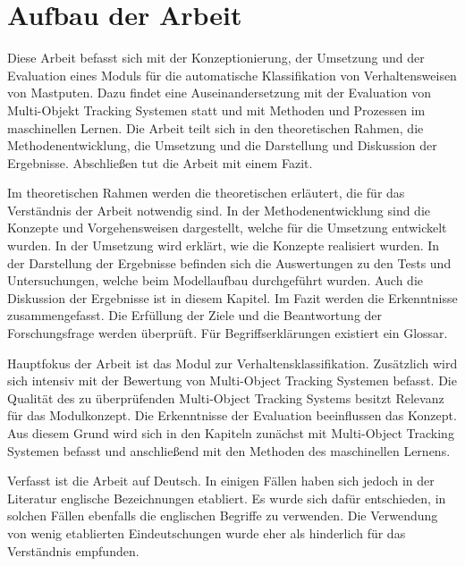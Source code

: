 \section{Aufbau der Arbeit}
Diese Arbeit befasst sich mit der Konzeptionierung, der Umsetzung und der Evaluation eines Moduls für die automatische Klassifikation von Verhaltensweisen von Mastputen. Dazu findet eine Auseinandersetzung mit der Evaluation von Multi-Objekt Tracking Systemen statt und mit Methoden und Prozessen im maschinellen Lernen. Die Arbeit teilt sich in den theoretischen Rahmen, die Methodenentwicklung, die Umsetzung und die Darstellung und Diskussion der Ergebnisse. Abschließen tut die Arbeit mit einem Fazit. \par

Im theoretischen Rahmen werden die theoretischen erläutert, die für das Verständnis der Arbeit notwendig sind. In der Methodenentwicklung sind die Konzepte und Vorgehensweisen dargestellt, welche für die Umsetzung entwickelt wurden. In der Umsetzung wird erklärt, wie die Konzepte realisiert wurden. In der Darstellung der Ergebnisse befinden sich die Auswertungen zu den Tests und Untersuchungen, welche beim Modellaufbau durchgeführt wurden. Auch die Diskussion der Ergebnisse ist in diesem Kapitel. Im Fazit werden die Erkenntnisse zusammengefasst. Die Erfüllung der Ziele und die Beantwortung der Forschungsfrage werden überprüft. Für Begriffserklärungen existiert ein Glossar.\par

Hauptfokus der Arbeit ist das Modul zur Verhaltensklassifikation. Zusätzlich wird sich intensiv mit der Bewertung von Multi-Object Tracking Systemen befasst. Die Qualität des zu überprüfenden Multi-Object Tracking Systems besitzt Relevanz für das Modulkonzept. Die Erkenntnisse der Evaluation beeinflussen das Konzept. Aus diesem Grund wird sich in den Kapiteln zunächst mit Multi-Object Tracking Systemen befasst und anschließend mit den Methoden des maschinellen Lernens.\par

Verfasst ist die Arbeit auf Deutsch. In einigen Fällen haben sich jedoch in der Literatur englische Bezeichnungen etabliert. Es wurde sich dafür entschieden, in solchen Fällen ebenfalls die englischen Begriffe zu verwenden. Die Verwendung von wenig etablierten Eindeutschungen wurde eher als hinderlich für das Verständnis empfunden. \par
